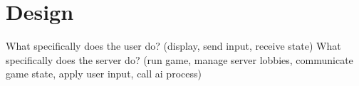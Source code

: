 \documentclass{standalone}
\begin{document}
	\section{Design}
		What specifically does the user do? (display, send input, receive state)
		What specifically does the server do? (run game, manage server lobbies, communicate game state, apply user input, call ai process)
\end{document}
